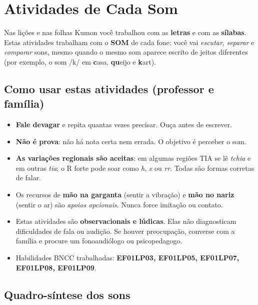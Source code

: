 \chapter{Atividades de Cada Som}

Nas lições e nas folhas Kumon você trabalhou com as \textbf{letras} e com as
\textbf{sílabas}. Estas atividades trabalham com o \textbf{SOM} de cada fone:
você vai \emph{escutar}, \emph{separar} e \emph{comparar} sons, mesmo quando o
mesmo som aparece escrito de jeitos diferentes (por exemplo, o som /k/ em
\textbf{c}asa, \textbf{qu}eijo e \textbf{k}art).

\section{Como usar estas atividades (professor e família)}

\begin{itemize}[leftmargin=1.6cm]
  \item \textbf{Fale devagar} e repita quantas vezes precisar. Ouça antes de escrever.
  \item \textbf{Não é prova}: não há nota certa nem errada. O objetivo é perceber o som.
  \item \textbf{As variações regionais são aceitas}: em algumas regiões TIA se lê
        \emph{tchia} e em outras \emph{tia}; o R forte pode soar como \emph{h}, \emph{x}
        ou \emph{rr}. Todas são formas corretas de falar.
  \item Os recursos de \textbf{mão na garganta} (sentir a vibração) e \textbf{mão no nariz}
        (sentir o ar) são \emph{apoios opcionais}. Nunca force imitação ou contato.
  \item Estas atividades são \textbf{observacionais e lúdicas}. Elas não diagnosticam
        dificuldades de fala ou audição. Se houver preocupação, converse com a família
        e procure um fonoaudiólogo ou psicopedagogo.
  \item Habilidades BNCC trabalhadas: \textbf{EF01LP03, EF01LP05, EF01LP07, EF01LP08,
        EF01LP09}.
\end{itemize}

\section{Quadro-síntese dos sons}


